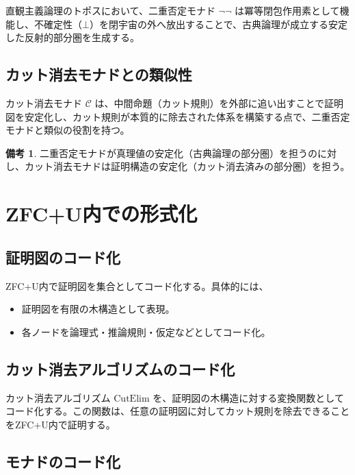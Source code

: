 \documentclass[11pt,a4paper]{article}
\theoremstyle{definition}
\newtheorem{remark}{備考}[section]
\newcommand{\monad}{\mathcal{C}}
\newcommand{\cutelim}{\mathrm{CutElim}}
\begin{document}
直観主義論理のトポスにおいて、二重否定モナド $\neg\neg$ は冪等閉包作用素として機能し、不確定性（$\bot$）を閉宇宙の外へ放出することで、古典論理が成立する安定した反射的部分圏を生成する。

\subsection{カット消去モナドとの類似性}

カット消去モナド $\monad$ は、中間命題（カット規則）を外部に追い出すことで証明図を安定化し、カット規則が本質的に除去された体系を構築する点で、二重否定モナドと類似の役割を持つ。

\begin{remark}
二重否定モナドが真理値の安定化（古典論理の部分圏）を担うのに対し、カット消去モナドは証明構造の安定化（カット消去済みの部分圏）を担う。
\end{remark}

\section{ZFC+U内での形式化}

\subsection{証明図のコード化}

ZFC+U内で証明図を集合としてコード化する。具体的には、
\begin{itemize}
  \item 証明図を有限の木構造として表現。
  \item 各ノードを論理式・推論規則・仮定などとしてコード化。
\end{itemize}

\subsection{カット消去アルゴリズムのコード化}

カット消去アルゴリズム $\cutelim$ を、証明図の木構造に対する変換関数としてコード化する。この関数は、任意の証明図に対してカット規則を除去できることをZFC+U内で証明する。

\subsection{モナドのコード化}
\end{document}
